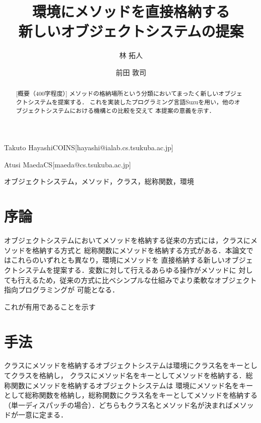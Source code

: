 \documentclass{ipsjprosym}
\begin{document}
\title{環境にメソッドを直接格納する \\ 新しいオブジェクトシステムの提案}


\author{林 拓人}{Takuto Hayashi}{COINS}[hayashi@ialab.cs.tsukuba.ac.jp]
\author{前田 敦司}{Atusi Maeda}{CS}[maeda@cs.tsukuba.ac.jp]

\begin{abstract}
[概要（400字程度）]
メソッドの格納場所という分類においてまったく新しいオブジェクトシステムを提案する．
これを実装したプログラミング言語Suzuを用い，他のオブジェクトシステムにおける機構との比較を交えて
本提案の意義を示す．
\end{abstract}

\begin{jkeyword}
オブジェクトシステム，メソッド，クラス，総称関数，環境
\end{jkeyword}

\maketitle

\section{序論}

オブジェクトシステムにおいてメソッドを格納する従来の方式には，クラスにメソッドを格納する方式と
総称関数にメソッドを格納する方式がある．本論文ではこれらのいずれとも異なり，環境にメソッドを
直接格納する新しいオブジェクトシステムを提案する．変数に対して行えるあらゆる操作がメソッドに
対しても行えるため，従来の方式に比べシンプルな仕組みでより柔軟なオブジェクト指向プログラミングが
可能となる．

これが有用であることを示す

\section{手法}

クラスにメソッドを格納するオブジェクトシステムは環境にクラス名をキーとしてクラスを格納し，
クラスにメソッド名をキーとしてメソッドを格納する．総称関数にメソッドを格納するオブジェクトシステムは
環境にメソッド名をキーとして総称関数を格納し，総称関数にクラス名をキーとしてメソッドを格納する
（単一ディスパッチの場合）．どちらもクラス名とメソッド名が決まればメソッドが一意に定まる．
\end{document}
